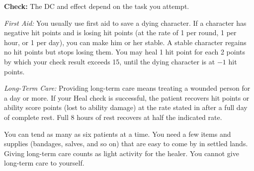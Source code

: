 \textbf{Check:} The DC and effect depend on the task you attempt.


\textit{First Aid:} You usually use first aid to save a dying character. If a character has negative hit points and is losing hit points (at the rate of 1 per round, 1 per hour, or 1 per day), you can make him or her stable. A stable character regains no hit points but stops losing them. You may heal 1 hit point for each 2 points by which your check result exceeds 15, until the dying character is at $-1$ hit points.

\textit{Long-Term Care:} Providing long-term care means treating a wounded person for a day or more. If your Heal check is successful, the patient recovers hit points or ability score points (lost to ability damage) at the rate stated in  after a full day of complete rest. Full 8 hours of rest recovers at half the indicated rate.


You can tend as many as six patients at a time. You need a few items and supplies (bandages, salves, and so on) that are easy to come by in settled lands. Giving long-term care counts as light activity for the healer. You cannot give long-term care to yourself.


